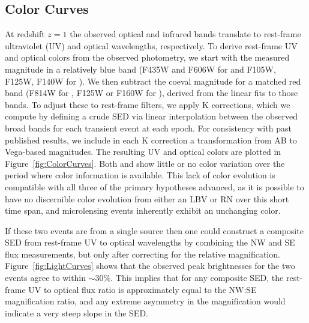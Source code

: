 \subsection{Color Curves}\label{sec:ColorCurves}

At redshift $z=1$ the observed optical and infrared bands translate to
rest-frame ultraviolet (UV) and optical wavelengths, respectively.  To
derive rest-frame UV and optical colors from the observed photometry,
we start with the measured magnitude in a relatively blue band (F435W
and F606W for \spockone and F105W, F125W, F140W for \spocktwo).  We
then subtract the coeval magnitude for a matched red band (F814W for
\spockone, F125W or F160W for \spocktwo), derived from the linear fits
to those bands.  To adjust these to rest-frame filters, we apply K
corrections\citep{Hogg:2002}, which we compute by
defining a crude SED via linear interpolation between the observed
broad bands for each transient event at each epoch.  For consistency
with past published results, we include in each K correction a
transformation from AB to Vega-based magnitudes.  The resulting UV and
optical colors are plotted in Figure~\ref{fig:ColorCurves}.  Both
\spockone and \spocktwo show little or no color variation over the
period where color information is available.  This lack of color
evolution is compatible with all three of the primary hypotheses
advanced, as it is possible to have no discernible color evolution
from either an LBV or RN over this short time span, and microlensing
events inherently exhibit an unchanging color.

If these two events are from a single source then one could construct
a composite SED from rest-frame UV to optical wavelengths by combining
the NW and SE flux measurements, but only after correcting for the
relative magnification.  Figure~\ref{fig:LightCurves} shows that the
observed peak brightnesses for the two events agree to within
$\sim30\%$.  This implies that for any composite SED, the rest-frame
UV to optical flux ratio is approximately equal to the NW:SE
magnification ratio, and any extreme asymmetry in the magnification
would indicate a very steep slope in the SED.
